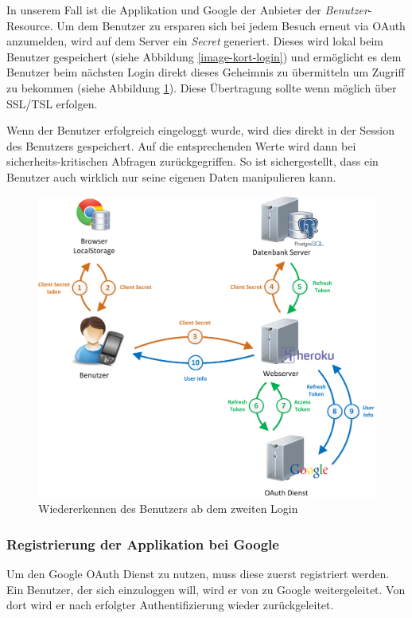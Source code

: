 In unserem Fall ist \kort{} die Applikation und Google der Anbieter der \emph{Benutzer}-Resource.
Um dem Benutzer zu ersparen sich bei jedem Besuch erneut via \gls{OAuth} anzumelden, wird auf dem Server ein \emph{Secret} generiert.
Dieses wird lokal beim Benutzer gespeichert (siehe Abbildung \ref{image-kort-login}) und ermöglicht es dem Benutzer beim nächsten Login direkt dieses Geheimnis zu übermitteln um Zugriff zu bekommen (siehe Abbildung \ref{image-kort-relogin}).
Diese Übertragung sollte wenn möglich über SSL/TSL erfolgen.

Wenn der Benutzer erfolgreich eingeloggt wurde, wird dies direkt in der Session des Benutzers gespeichert.
Auf die entsprechenden Werte wird dann bei sicherheits-kritischen Abfragen zurückgegriffen.
So ist sichergestellt, dass ein Benutzer auch wirklich nur seine eigenen Daten manipulieren kann.

\begin{figure}[H]
	\centering
	\includegraphics[scale=0.4]{images/implementation/backend/kort-relogin}
	\caption{Wiedererkennen des Benutzers ab dem zweiten Login}
	\label{image-kort-relogin}
\end{figure}

\subsubsection{Registrierung der Applikation bei Google}
Um den Google \gls{OAuth} Dienst zu nutzen, muss diese zuerst registriert werden.
Ein Benutzer, der sich einzuloggen will, wird er von \kort{} zu Google weitergeleitet.
Von dort wird er nach erfolgter Authentifizierung wieder zurückgeleitet.


